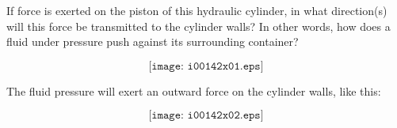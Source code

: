

If force is exerted on the piston of this hydraulic cylinder, in what direction(s) will this force be transmitted to the cylinder walls?  In other words, how does a fluid under pressure push against its surrounding container?

$$\texttt{[image: i00142x01.eps]}$$







The fluid pressure will exert an outward force on the cylinder walls, like this:

$$\texttt{[image: i00142x02.eps]}$$











